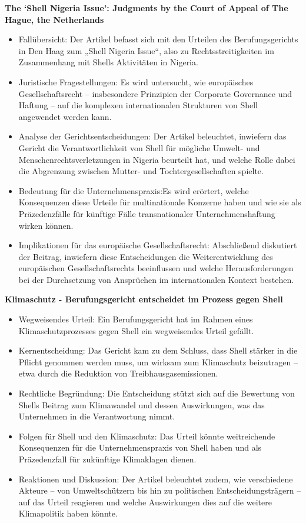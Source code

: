 \documentclass[a4paper, 12pt]{article} %
\begin{document}
 \textbf{\cite{de2016shell} The ‘{{Shell}} Nigeria Issue’: Judgments by the Court of Appeal of {{The Hague}}, the {{Netherlands}}}

 \begin{itemize}
    \item Fallübersicht: Der Artikel befasst sich mit den Urteilen des Berufungsgerichts in Den Haag zum „Shell Nigeria Issue“, also zu Rechtsstreitigkeiten im Zusammenhang mit Shells Aktivitäten in Nigeria.
    \item Juristische Fragestellungen: Es wird untersucht, wie europäisches Gesellschaftsrecht – insbesondere Prinzipien der Corporate Governance und Haftung – auf die komplexen internationalen Strukturen von Shell angewendet werden kann.
    \item Analyse der Gerichtsentscheidungen: Der Artikel beleuchtet, inwiefern das Gericht die Verantwortlichkeit von Shell für mögliche Umwelt- und Menschenrechtsverletzungen in Nigeria beurteilt hat, und welche Rolle dabei die Abgrenzung zwischen Mutter- und Tochtergesellschaften spielte.
    \item Bedeutung für die Unternehmenspraxis:Es wird erörtert, welche Konsequenzen diese Urteile für multinationale Konzerne haben und wie sie als Präzedenzfälle für künftige Fälle transnationaler Unternehmenshaftung wirken können.
    \item Implikationen für das europäische Gesellschaftsrecht: Abschließend diskutiert der Beitrag, inwiefern diese Entscheidungen die Weiterentwicklung des europäischen Gesellschaftsrechts beeinflussen und welche Herausforderungen bei der Durchsetzung von Ansprüchen im internationalen Kontext bestehen.
 \end{itemize}

 \textbf{\cite{deutschlandfunk.deKlimaschutzBerufungsgerichtEntscheidet2024} Klimaschutz - Berufungsgericht entscheidet im Prozess gegen Shell}

 \begin{itemize}
    \item Wegweisendes Urteil: Ein Berufungsgericht hat im Rahmen eines Klimaschutzprozesses gegen Shell ein wegweisendes Urteil gefällt.
    \item Kernentscheidung: Das Gericht kam zu dem Schluss, dass Shell stärker in die Pflicht genommen werden muss, um wirksam zum Klimaschutz beizutragen – etwa durch die Reduktion von Treibhausgasemissionen.
    \item Rechtliche Begründung: Die Entscheidung stützt sich auf die Bewertung von Shells Beitrag zum Klimawandel und dessen Auswirkungen, was das Unternehmen in die Verantwortung nimmt.
    \item Folgen für Shell und den Klimaschutz: Das Urteil könnte weitreichende Konsequenzen für die Unternehmenspraxis von Shell haben und als Präzedenzfall für zukünftige Klimaklagen dienen.
    \item Reaktionen und Diskussion: Der Artikel beleuchtet zudem, wie verschiedene Akteure – von Umweltschützern bis hin zu politischen Entscheidungsträgern – auf das Urteil reagieren und welche Auswirkungen dies auf die weitere Klimapolitik haben könnte.
 \end{itemize}
\end{document}
